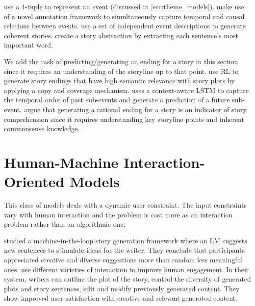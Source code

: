 \citep{martin2018event} use a 4-tuple to represent an event (discussed in \cref{sec:theme_models}). \citep{mostafazadeh2016caters} make use of a novel annotation framework to simultaneously capture temporal and causal relations between events. \citep{jain2017story} use a set of independent event descriptions to generate coherent stories. \citep{yao2019plan} create a story abstraction by extracting each sentence's most important word.

We add the task of predicting/generating an ending for a story in this section since it requires an understanding of the storyline up to that point. \citep{zhao2018plots} use RL to generate story endings that have high semantic relevance with story plots by applying a copy and coverage mechanism. \citep{hu2017happens} uses a context-aware LSTM to capture the temporal order of past sub-events and generate a prediction of a future sub-event. \citep{guan2019story} argue that generating a rational ending for a story is an indicator of story comprehension since it requires understanding key storyline points and inherent commonsense knowledge.



\section{Human-Machine Interaction-Oriented Models}
\label{sec:interaction_models}

This class of models deals with a dynamic user constraint. The input constraints vary with human interaction and the problem is cast more as an interaction problem rather than an algorithmic one.

\citep{clark2018creative} studied a machine-in-the-loop story generation framework where an LM suggests new sentences to stimulate ideas for the writer. They conclude that participants appreciated creative and diverse suggestions more than random less meaningful ones. \citep{goldfarb2019plan} use different varieties of interaction to improve human engagement. In their system, writers can outline the plot of the story, control the diversity of generated plots and story sentences, edit and modify previously generated content. They show improved user satisfaction with creative and relevant generated content.



